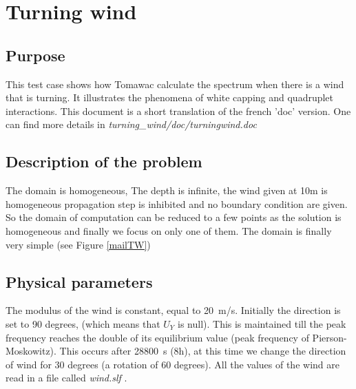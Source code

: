 \section{Turning wind}
%

%
\subsection{Purpose}
%
This test case shows how Tomawac calculate the spectrum when there is a wind that is turning. It illustrates the phenomena of white capping and quadruplet interactions.  This document is a short translation of the french 'doc' version. One can find more details in {\it turning\_wind/doc/turningwind.doc}

%
\subsection{Description of the problem}
%
The domain is homogeneous, The depth is infinite, the wind given at 10m is homogeneous  propagation step is inhibited and no boundary condition are given.
So the domain of computation can be reduced to a few points as the solution is homogeneous and finally we focus on only one of them. The domain is finally very simple (see Figure \ref{mailTW})


%
%
\subsection{Physical parameters}
%
The modulus of the wind is constant, equal to 20~m/s. Initially the direction is set to 90 degrees, (which means that $U_Y$ is null). This is maintained till the peak frequency reaches the double of its equilibrium value (peak frequency of Pierson-Moskowitz). This occurs after 28800~s (8h), at this time we change the direction of wind for 30 degrees (a rotation of 60 degrees). All the values of the wind are read in a file called {\it wind.slf  }.
%
%
